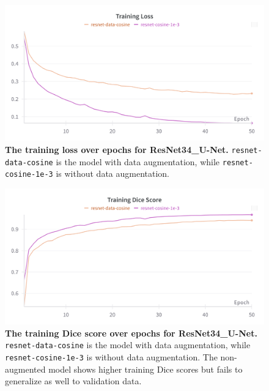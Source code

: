 \documentclass[twocolumn,a4paper]{article}
\begin{document}
\begin{figure}[H]
\centering
\includegraphics[width=0.95\linewidth]{figs/aug_resnet_train_loss}
\caption{\textbf{The training loss over epochs for ResNet34\_U-Net.} \texttt{resnet-data-cosine} is the model with data augmentation, while \texttt{resnet-cosine-1e-3} is without data augmentation.}
\label{fig:augresnettrainloss}
\end{figure}
\begin{figure}[H]
\centering
\includegraphics[width=0.95\linewidth]{figs/aug_resnet_train_dice}
\caption{\textbf{The training Dice score over epochs for ResNet34\_U-Net.} \texttt{resnet-data-cosine} is the model with data augmentation, while \texttt{resnet-cosine-1e-3} is without data augmentation. The non-augmented model shows higher training Dice scores but fails to generalize as well to validation data.}
\label{fig:augresnettraindice}
\end{figure}
\end{document}
